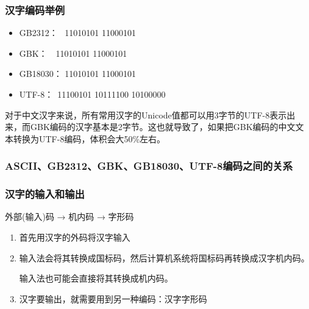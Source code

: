 \begin{frame}
    \frametitle{汉字编码举例}
    \begin{minipage}{0.28\linewidth}
        \centering
        \fontsize{80pt}{1.2}
    \end{minipage}\hfill
    \begin{minipage}{0.68\linewidth}
        \begin{itemize}
          \item GB2312：{\ttfamily \ \,\,11010101 11000101}
          \item GBK：{\ttfamily \quad \ \ 11010101 11000101}
          \item GB18030：{\ttfamily \,\,11010101 11000101}
          \item UTF-8：{\ttfamily \quad \ 11100101 10111100 10100000}
        \end{itemize}
    \end{minipage}

    \bigskip
    对于中文汉字来说，所有常用汉字的Unicode值都可以用3字节的UTF-8表示出来，而GBK编码的汉字基本是2字节。这也就导致了，如果把GBK编码的中文文本转换为UTF-8编码，体积会大50\%左右。
\end{frame}

\begin{frame}
    \frametitle{ASCII、GB2312、GBK、GB18030、UTF-8编码之间的关系}
\begin{center}
\end{center}
\end{frame}

\begin{frame}
    \frametitle{汉字的输入和输出}
    外部(输入)码 → 机内码 → 字形码
    \begin{enumerate}
      \item 首先用汉字的外码将汉字输入
      \item 输入法会将其转换成国标码，然后计算机系统将国标码再转换成汉字机内码。
      
      输入法也可能会直接将其转换成机内码。
      \item 汉字要输出，就需要用到另一种编码：汉字字形码
    \end{enumerate}
\end{frame}

